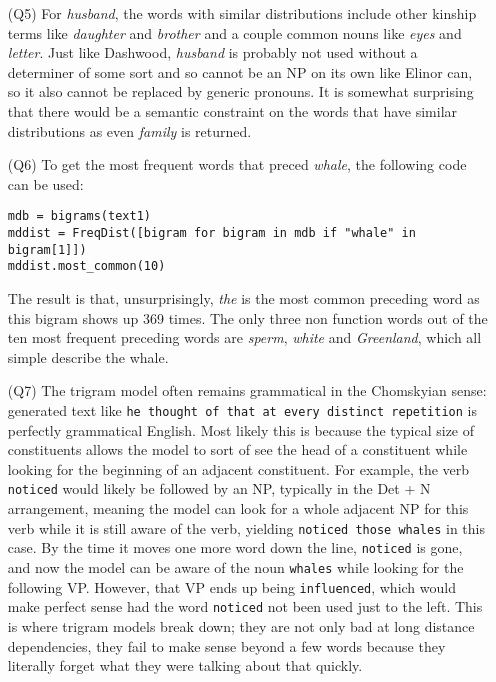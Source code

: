 \documentclass{article}
\begin{document}
\begin{itemize}
    \item[(Q5)] For \textit{husband}, the words with similar distributions include other kinship terms like \textit{daughter} and \textit{brother} and a couple common nouns like \textit{eyes} and \textit{letter}. Just like Dashwood, \textit{husband} is probably not used without a determiner of some sort and so cannot be an NP on its own like Elinor can, so it also cannot be replaced by generic pronouns. It is somewhat surprising that there would be a semantic constraint on the words that have similar distributions as even \textit{family} is returned.
    \item[(Q6)] To get the most frequent words that preced \textit{whale}, the following code can be used:
    \item[] \begin{lstlisting}
mdb = bigrams(text1)
mddist = FreqDist([bigram for bigram in mdb if "whale" in bigram[1]])
mddist.most_common(10)
            \end{lstlisting}
    \item[] The result is that, unsurprisingly, \textit{the} is the most common preceding word as this bigram shows up 369 times. The only three non function words out of the ten most frequent preceding words are \textit{sperm}, \textit{white} and \textit{Greenland}, which all simple describe the whale.
    \item[(Q7)] The trigram model often remains grammatical in the Chomskyian sense: generated text like \texttt{he thought of that at every distinct repetition} is perfectly grammatical English. Most likely this is because the typical size of constituents allows the model to sort of see the head of a constituent while looking for the beginning of an adjacent constituent. For example, the verb \texttt{noticed} would likely be followed by an NP, typically in the Det + N arrangement, meaning the model can look for a whole adjacent NP for this verb while it is still aware of the verb, yielding \texttt{noticed those whales} in this case. By the time it moves one more word down the line, \texttt{noticed} is gone, and now the model can be aware of the noun \texttt{whales} while looking for the following VP. However, that VP ends up being \texttt{influenced}, which would make perfect sense had the word \texttt{noticed} not been used just to the left. This is where trigram models break down; they are not only bad at long distance dependencies, they fail to make sense beyond a few words because they literally forget what they were talking about that quickly.
  \end{itemize}
\end{document}
